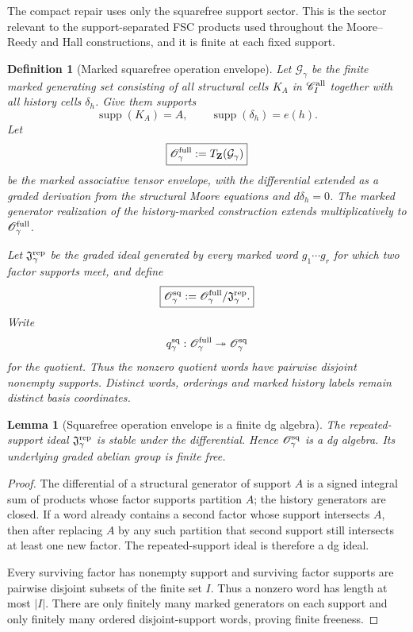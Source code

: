 \documentclass[11pt]{article}
\newtheorem{lemma}[theorem]{Lemma}
\newtheorem{definition}[theorem]{Definition}
\theoremstyle{remark}
\newcommand{\Z}{\mathbf Z}
\begin{document}
The compact repair uses only the squarefree support sector.  This is the sector
relevant to the support-separated FSC products used throughout the Moore--Reedy
and Hall constructions, and it is finite at each fixed support.

\begin{definition}[Marked squarefree operation envelope]
\label{P2M-def:v22-squarefree-operation-envelope}
Let $\mathcal G_{\gamma}$ be the finite marked generating set consisting of all
structural cells $K_A$ in $\mathscr C_I^{\rm all}$ together with all history
cells $\delta_h$.  Give them supports
\[
 \operatorname{supp}(K_A)=A,
 \qquad
 \operatorname{supp}(\delta_h)=e(h).
\]
Let
\begin{equation}
 \boxed{
 \mathscr O_{\gamma}^{\rm full}:=T_{\Z}(\mathcal G_{\gamma})}
\end{equation}
be the marked associative tensor envelope, with the differential extended as a
graded derivation from the structural Moore equations and $d\delta_h=0$.  The
marked generator realization of the history-marked construction extends multiplicatively to
$\mathscr O_{\gamma}^{\rm full}$.

Let $\mathfrak J_{\gamma}^{\rm rep}$ be the graded ideal generated by every
marked word $g_1\cdots g_r$ for which two factor supports meet, and define
\begin{equation}
 \boxed{
 \mathscr O_{\gamma}^{\rm sq}
 :=\mathscr O_{\gamma}^{\rm full}/\mathfrak J_{\gamma}^{\rm rep}.}
\end{equation}
Write
\[
 q_{\gamma}^{\rm sq}:\mathscr O_{\gamma}^{\rm full}
 \twoheadrightarrow\mathscr O_{\gamma}^{\rm sq}
\]
for the quotient.  Thus the nonzero quotient words have pairwise disjoint
nonempty supports.  Distinct words, orderings and marked history labels remain
distinct basis coordinates.
\end{definition}

\begin{lemma}[Squarefree operation envelope is a finite dg algebra]
\label{P2M-lem:v22-squarefree-operation-dg}
The repeated-support ideal $\mathfrak J_{\gamma}^{\rm rep}$ is stable under the
differential.  Hence $\mathscr O_{\gamma}^{\rm sq}$ is a dg algebra.  Its
underlying graded abelian group is finite free.
\end{lemma}

\begin{proof}
The differential of a structural generator of support $A$ is a signed integral
sum of products whose factor supports partition $A$; the history generators are
closed.  If a word already contains a second factor whose support intersects
$A$, then after replacing $A$ by any such partition that second support still
intersects at least one new factor.  The repeated-support ideal is therefore a
dg ideal.

Every surviving factor has nonempty support and surviving factor supports are
pairwise disjoint subsets of the finite set $I$.  Thus a nonzero word has length
at most $|I|$.  There are only finitely many marked generators on each support
and only finitely many ordered disjoint-support words, proving finite freeness.
\end{proof}
\end{document}
